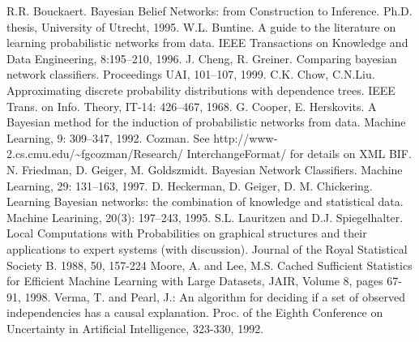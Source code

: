\begin{thebibliography}{999}
		R.R. Bouckaert. Bayesian Belief Networks: from Construction to Inference. 
		Ph.D. thesis, 
		University of Utrecht, 
		1995.
		W.L. Buntine. A guide to the literature on learning probabilistic networks from data.
		IEEE Transactions on Knowledge and Data Engineering, 8:195--210, 
		1996. 
		J. Cheng, R. Greiner. 
		Comparing bayesian network classifiers. 
		Proceedings UAI,
		101--107,
		1999.
		C.K. Chow, C.N.Liu.
		Approximating discrete probability distributions with dependence trees.
		IEEE Trans. on Info. Theory, IT-14: 426--467, 1968.
		G. Cooper, E. Herskovits. 
		A Bayesian method for the induction of probabilistic networks from data. 
		Machine Learning, 9: 309--347, 1992.
		Cozman.
		See {\sf http://www-2.cs.cmu.edu/\~{}fgcozman/Research/	InterchangeFormat/}
		for details on XML BIF.
		N. Friedman, D. Geiger, M. Goldszmidt. 
		Bayesian Network Classifiers. 
		Machine Learning, 29: 131--163, 1997.
		D. Heckerman, D. Geiger, D. M. Chickering. 
		Learning Bayesian networks: the combination of knowledge and statistical data. 
		Machine Learining, 20(3): 197--243, 1995.
		S.L. Lauritzen and D.J. Spiegelhalter.
		Local Computations with Probabilities on graphical structures and their applications to expert systems (with discussion).
		Journal of the Royal Statistical Society B.
		1988, 50, 157-224
		Moore, A. and Lee, M.S. Cached Sufficient Statistics for Efficient Machine Learning with Large Datasets,
		JAIR, Volume 8, pages 67-91, 1998.
		Verma, T. and Pearl, J.:
		An algorithm for deciding if a set of observed independencies has a causal explanation.
		Proc. of the Eighth Conference on Uncertainty in Artificial Intelligence,
		323-330, 1992.


\end{thebibliography}
